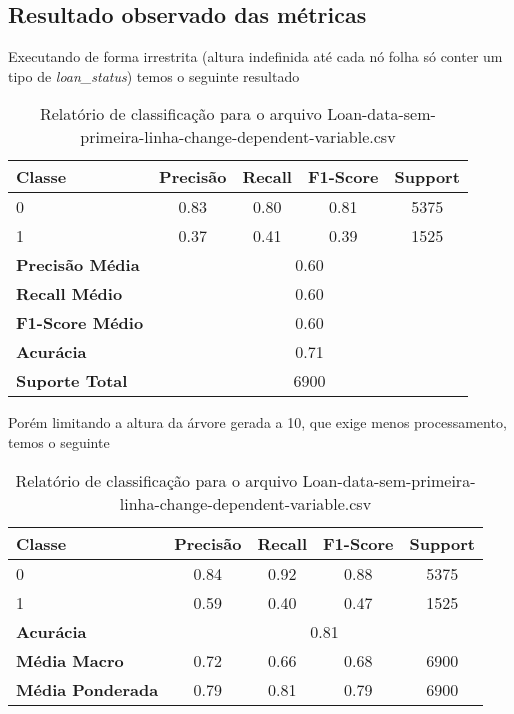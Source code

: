 \documentclass[12pt]{article}
\begin{document}
\subsection{Resultado observado das métricas}
Executando de forma irrestrita (altura indefinida até cada nó folha só conter um tipo de \textit{loan\_status}) temos o seguinte resultado
\begin{table}[h]
	\centering
	\begin{tabular}{lcccc}
		\hline
		\textbf{Classe} & \textbf{Precisão} & \textbf{Recall} & \textbf{F1-Score} & \textbf{Support} \\ \hline
		0                & 0.83              & 0.80               & 0.81               & 5375              \\
		1                & 0.37              & 0.41               & 0.39               & 1525              \\ \hline
		\textbf{Precisão Média} & \multicolumn{4}{c}{0.60} \\
		\textbf{Recall Médio} & \multicolumn{4}{c}{0.60} \\
		\textbf{F1-Score Médio} & \multicolumn{4}{c}{0.60} \\
		\textbf{Acurácia} & \multicolumn{4}{c}{0.71} \\
		\textbf{Suporte Total} & \multicolumn{4}{c}{6900} \\ \hline
	\end{tabular}
	\caption{Relatório de classificação para o arquivo Loan-data-sem-primeira-linha-change-dependent-variable.csv}
	\label{tab:class_report}
\end{table}

Porém limitando a altura da árvore gerada a 10, que exige menos processamento, temos o seguinte

\begin{table}[h]
	\centering
	\begin{tabular}{lcccc}
		\hline
		\textbf{Classe} & \textbf{Precisão} & \textbf{Recall} & \textbf{F1-Score} & \textbf{Support} \\ \hline
		0                & 0.84              & 0.92               & 0.88               & 5375              \\
		1                & 0.59              & 0.40               & 0.47               & 1525              \\ \hline
		\textbf{Acurácia} & \multicolumn{4}{c}{0.81} \\
		\textbf{Média Macro} & 0.72 & 0.66 & 0.68 & 6900 \\
		\textbf{Média Ponderada} & 0.79 & 0.81 & 0.79 & 6900 \\ \hline
	\end{tabular}
	\caption{Relatório de classificação para o arquivo Loan-data-sem-primeira-linha-change-dependent-variable.csv}
	\label{tab:class_report}
\end{table}
\end{document}
